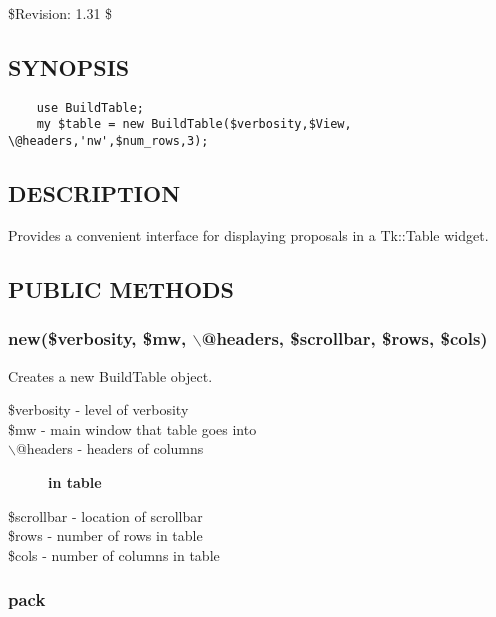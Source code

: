 \documentclass{article}
\begin{document}
\$Revision: 1.31 \$

\subsection*{SYNOPSIS\label{BuildTable_SYNOPSIS}}
\begin{verbatim}
    use BuildTable;
    my $table = new BuildTable($verbosity,$View, \@headers,'nw',$num_rows,3);
\end{verbatim}
\subsection*{DESCRIPTION\label{BuildTable_DESCRIPTION}}


Provides a convenient interface for displaying proposals in a Tk::Table widget.

\subsection*{PUBLIC METHODS\label{BuildTable_PUBLIC_METHODS}}
\subsubsection*{new(\$verbosity, \$mw, $\backslash$@headers, \$scrollbar, \$rows, \$cols)\label{BuildTable_new_verbosity_mw_backslash_headers_scrollbar_rows_cols_}}


Creates a new BuildTable object.

\begin{description}

\item[{\$verbosity - level of verbosity}] \mbox{}
\item[{\$mw - main window that table goes into}] \mbox{}
\item[{$\backslash$@headers - headers of columns}] \textbf{in table}
\item[{\$scrollbar - location of scrollbar}] \mbox{}
\item[{\$rows - number of rows in table}] \mbox{}
\item[{\$cols - number of columns in table}] \mbox{}\end{description}
\subsubsection*{pack\label{BuildTable_pack}}
\end{document}
